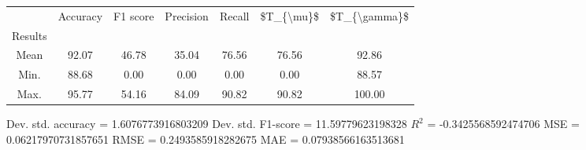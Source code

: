 \begin{tabular}{|c|c|c|c|c|c|c|}
\toprule
{} &  Accuracy &  F1 score &  Precision &  Recall &  \$T\_\{\textbackslash mu\}\$ &  \$T\_\{\textbackslash gamma\}\$ \\
Results &           &           &            &         &            &               \\
\hline
Mean    &     92.07 &     46.78 &      35.04 &   76.56 &      76.56 &         92.86 \\
Min.    &     88.68 &      0.00 &       0.00 &    0.00 &       0.00 &         88.57 \\
Max.    &     95.77 &     54.16 &      84.09 &   90.82 &      90.82 &        100.00 \\
\bottomrule
\end{tabular}

 Dev. std. accuracy = 1.6076773916803209
 Dev. std. F1-score = 11.59779623198328
 $R^2$ = -0.3425568592474706
 MSE = 0.06217970731857651
 RMSE = 0.2493585918282675
 MAE = 0.07938566163513681